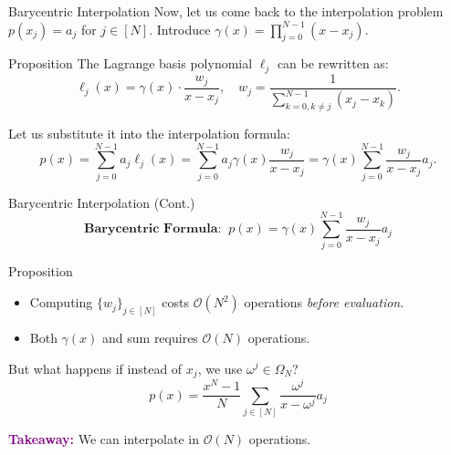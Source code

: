 \documentclass{zkdl-presentation-template}
\begin{document}
    \begin{frame}{Barycentric Interpolation}
        Now, let us come back to the interpolation problem $p(x_j) = a_j$ for $j \in [N]$.
        Introduce $\gamma(x) = \prod_{j=0}^{N-1}(x-x_j)$. 

        \begin{block}{Proposition}
            The Lagrange basis polynomial $\ell_j$ can be rewritten as:
            \begin{equation*}
                \ell_j(x) = \gamma(x) \cdot \frac{w_j}{x-x_j}, \quad w_j = \frac{1}{\sum_{k=0,k\neq j}^{N-1}(x_j-x_k)}.
            \end{equation*}
        \end{block}

        Let us substitute it into the interpolation formula:
        \begin{equation*}
            p(x) = \sum_{j=0}^{N-1}a_j\ell_j(x) = \sum_{j=0}^{N-1}a_j\gamma(x)\frac{w_j}{x-x_j} = \gamma(x)\sum_{j=0}^{N-1}\frac{w_j}{x-x_j}a_j.
        \end{equation*}
    \end{frame}

    \begin{frame}{Barycentric Interpolation (Cont.)}
        \begin{equation*}
            \boxed{\textbf{Barycentric Formula:} \; \; p(x) = \gamma(x)\sum_{j=0}^{N-1}\frac{w_j}{x-x_j}a_j}
        \end{equation*}

        \begin{alertblock}{Proposition}
            \begin{itemize}
                \item Computing $\{w_j\}_{j \in [N]}$ costs $\mathcal{O}(N^2)$
                operations \emph{before evaluation}.
                \item Both $\gamma(x)$ and sum requires $\mathcal{O}(N)$ operations.
            \end{itemize}
        \end{alertblock}

        But what happens if instead of $x_j$, we use $\omega^j \in \Omega_N$?
        \begin{equation*}
            \boxed{p(x) = \frac{x^N-1}{N}\sum_{j \in [N]}\frac{\omega^j}{x-\omega^j}a_j}
        \end{equation*}

        \textcolor{purple}{\textbf{Takeaway:}} We can interpolate in $\mathcal{O}(N)$ operations.
    \end{frame}
\end{document}
